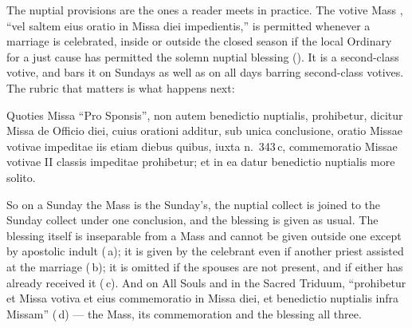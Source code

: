 The nuptial provisions are the ones a reader meets in practice. The votive
Mass , ``vel saltem eius oratio in Missa diei impedientis,''
is permitted whenever a marriage is celebrated, inside or outside the closed
season if the local Ordinary for a just cause has permitted the solemn nuptial
blessing (). It is a second-class votive, and  bars it on
Sundays as well as on all days barring second-class votives. The rubric that
matters is what happens next:

\begin{rulebox}{}
Quoties Missa ``Pro Sponsis'', non autem benedictio nuptialis, prohibetur,
dicitur Missa de Officio diei, cuius orationi additur, sub unica conclusione,
oratio Missae votivae impeditae iis etiam diebus quibus, iuxta n.~343\,c,
commemoratio Missae votivae II classis impeditae prohibetur; et in ea datur
benedictio nuptialis more solito.
\end{rulebox}

\noindent
So on a Sunday the Mass is the Sunday's, the nuptial collect is joined to the
Sunday collect under one conclusion, and the blessing is given as usual. The
blessing itself is inseparable from a Mass and cannot be given outside one
except by apostolic indult (\,a); it is given by the celebrant even
if another priest assisted at the marriage (\,b); it is omitted if the
spouses are not present, and if either has already received it (\,c).
And on All Souls and in the Sacred Triduum, ``prohibetur et Missa votiva et
eius commemoratio in Missa diei, et benedictio nuptialis infra Missam''
(\,d) --- the Mass, its commemoration and the blessing all three.

